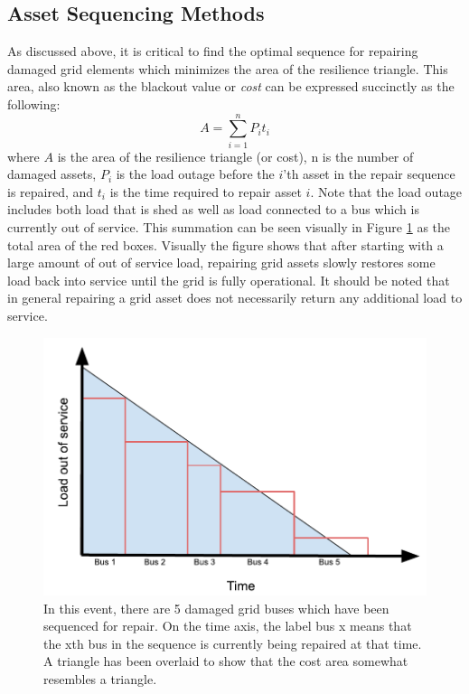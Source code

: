 \documentclass[12pt]{article}
\begin{document}
\subsection{Asset Sequencing Methods}
As discussed above, it is critical to find the optimal sequence for repairing damaged grid elements which minimizes the area of the resilience triangle. This area, also known as the blackout value or \textit{cost} can be expressed succinctly as the following:
\begin{equation} 
    A=\sum_{i=1}^{n}{P_it_i}
    \label{eq:cost}
\end{equation}
where $A$ is the area of the resilience triangle (or cost), n is the number of damaged assets, $P_i$ is the load outage before the $i$’th asset in the repair sequence is repaired, and $t_i$ is the time required to repair asset $i$. Note that the load outage includes both load that is shed as well as load connected to a bus which is currently out of service. This summation can be seen visually in Figure \ref{fig:costfigure} as the total area of the red boxes.  Visually the figure shows that after starting with a large amount of out of service load, repairing grid assets slowly restores some load back into service until the grid is fully operational. It should be noted that in general repairing a grid asset does not necessarily return any additional load to service. \par
\begin{figure}[ht]
    \centering %
    \includegraphics[scale = 0.9]{costfigure.pdf}
    \caption[Cost (blackout value) formula visualized]{In this event, there are 5 damaged grid buses which have been sequenced for repair. On the time axis, the label bus x means that the xth bus in the sequence is currently being repaired at that time. A triangle has been overlaid to show that the cost area somewhat resembles a triangle.}
    \label{fig:costfigure}
\end{figure}
\end{document}
